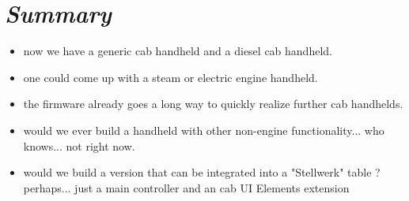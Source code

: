 \section{\textit{Summary}}
\begin{itemize}
\item now we have a generic cab handheld and a diesel cab handheld.
\item one could come up with a steam or electric engine handheld. 
\item the firmware already goes a long way to quickly realize further cab handhelds.
\item would we ever build a handheld with other non-engine functionality... who knows... not right now.
\item would we build a version that can be integrated into a "Stellwerk" table ? perhaps... just a main controller and an cab UI Elements extension
\end{itemize}
